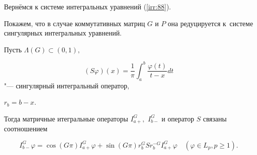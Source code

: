 Вернёмся к системе интегральных уравнений (\ref{irr:88}). 

Покажем, что в случае коммутативных матриц $G$ и $P$ она редуцируется к~системе сингулярных интегральных уравнений.



\smallskip

\begin{lemma}[1]Пусть $\Lambda(G)\subset(0, 1),$ 

$$(S\varphi)(x)=\frac{1}{\pi}\int _{a}^{b}\frac{\varphi(t)}{t-x} dt$$ "--- сингулярный интегральный оператор{\rm,}

 $r_{b}=b-x.$ 

Тогда матричные итегральные операторы $I_{a+}^{G},$ $I_{b-}^{G}$ и оператор $S$ связаны соотношением

\begin{equation}\label{irr:999}

I_{b-}^{G}\varphi=\cos(G\pi)I_{a+}^{G}\varphi+\sin(G\pi)r_{b}^{G}Sr_{b}^{-G}I_{a+}^{G}\varphi \quad (\varphi \in L_{p}, p\geq1).

\end{equation}

\end{lemma}



